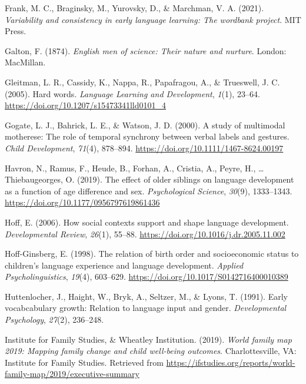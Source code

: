 \documentclass[
  english,
  man,floatsintext]{apa6}
\newlength{\cslhangindent}
\newenvironment{CSLReferences}[2] %
 {%
  \setlength{\parindent}{0pt}
  \ifodd #1 \everypar{\setlength{\hangindent}{\cslhangindent}}\ignorespaces\fi
  \ifnum #2 > 0
  \setlength{\parskip}{#2\baselineskip}
  \fi
 }%
 {}
\begin{document}
\begin{CSLReferences}{1}{0}
\leavevmode{}%
Frank, M. C., Braginsky, M., Yurovsky, D., \& Marchman, V. A. (2021). \emph{Variability and consistency in early language learning: The wordbank project}. {MIT} Press.

\leavevmode{}%
Galton, F. (1874). \emph{English men of science: Their nature and nurture}. London: {MacMillan}.

\leavevmode{}%
Gleitman, L. R., Cassidy, K., Nappa, R., Papafragou, A., \& Trueswell, J. C. (2005). Hard words. \emph{Language Learning and Development}, \emph{1}(1), 23--64. \url{https://doi.org/10.1207/s15473341lld0101_4}

\leavevmode{}%
Gogate, L. J., Bahrick, L. E., \& Watson, J. D. (2000). A study of multimodal motherese: The role of temporal synchrony between verbal labels and gestures. \emph{Child Development}, \emph{71}(4), 878--894. \url{https://doi.org/10.1111/1467-8624.00197}

\leavevmode{}%
Havron, N., Ramus, F., Heude, B., Forhan, A., Cristia, A., Peyre, H., \ldots{} Thiebaugeorges, O. (2019). The effect of older siblings on language development as a function of age difference and sex. \emph{Psychological Science}, \emph{30}(9), 1333--1343. \url{https://doi.org/10.1177/0956797619861436}

\leavevmode{}%
Hoff, E. (2006). How social contexts support and shape language development. \emph{Developmental Review}, \emph{26}(1), 55--88. \url{https://doi.org/10.1016/j.dr.2005.11.002}

\leavevmode{}%
Hoff-Ginsberg, E. (1998). The relation of birth order and socioeconomic status to children's language experience and language development. \emph{Applied Psycholinguistics}, \emph{19}(4), 603--629. \url{https://doi.org/10.1017/S0142716400010389}

\leavevmode{}%
Huttenlocher, J., Haight, W., Bryk, A., Seltzer, M., \& Lyons, T. (1991). Early vocabcabulary growth: Relation to language input and gender. \emph{Developmental Psychology}, \emph{27}(2), 236--248.

\leavevmode{}%
Institute for Family Studies, \& Wheatley Institution. (2019). \emph{World family map 2019: Mapping family change and child well-being outcomes}. Charlottesville, {VA}: Institute for Family Studies. Retrieved from \url{https://ifstudies.org/reports/world-family-map/2019/executive-summary}


\end{CSLReferences}
\end{document}
